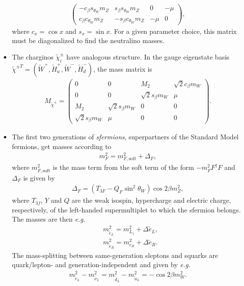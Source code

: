 \begin{itemize}
\begin{align}
\begin{pmatrix}
 			- c_\beta s_{\theta_W} m_Z &  s_\beta s_{\theta_W} m_Z & 0 & -\mu \\
			 c_\beta c_{\theta_W} m_Z & - s_\beta c_{\theta_W} m_Z & -\mu & 0
 		\end{pmatrix},
 	\end{align}
 	where $c_x = \cos x$ and $s_x = \sin x$. For a given parameter choice, this matrix must be diagonalized to find the neutralino masses.
 	\item The charginos $\tilde\chi_i^\pm$ have analogous structure. In the gauge eigenstate basis $\tilde \chi^{\pm T} = (\tilde W^+, \tilde H_u^+, \tilde W^-, \tilde H_d^-)$, the mass matrix is
 	\begin{align}
 		M_{\tilde \chi^\pm} = \begin{pmatrix}
 			0 & 0 & M_2 & \sqrt{2} c_\beta m_W  \\
 			0 & 0 & \sqrt{2} s_\beta m_W & \mu \\
 			M_2 & \sqrt{2} s_\beta m_W & 0 & 0\\
 			\sqrt{2} s_\beta m_W & \mu & 0 & 0
 		\end{pmatrix}.
 	\end{align}
 	\item The first two generations of {\it sfermions}, superpartners of the Standard Model fermions, get masses according to
 	\begin{align}
 		m^2_F = m^2_{F,\mathrm{soft}} + \Delta_F,
 	\end{align}
 	where $m^2_{F,\mathrm{soft}}$ is the mass term from the soft term of the form $-m^2_F F^\dag F$ and $\Delta_F$ is given by
 	\begin{align}
 		\Delta_F = (T_{3F} - Q_F \sin^2\theta_W)\cos 2\beta m^2_Z,
 	\end{align}
 	where $T_{3f}$, $Y$ and $Q$ are the weak isospin, hypercharge and electric charge, respectively, of the left-handed supermultiplet to which the sfermion belongs. The masses are then {\it e.g.}\
 	\begin{align}
 		&m^2_{\tilde e_L} = m^2_{L_1} + \Delta \tilde e_L,\\
 		&m^2_{\tilde e_R} = m^2_{e_R} + \Delta \tilde e_R.
 	\end{align}
 	The mass-splitting between same-generation sleptons and squarks are quark/lepton- and generation-independent and given by {\it e.g.}\ 
 	\begin{align}
 		m^2_{\tilde e_L} - m^2_{\tilde \nu_L} = m^2_{\tilde d_L} - m^2_{\tilde u_L} = -\cos 2\beta m_W^2.

\end{align}
\end{itemize}
